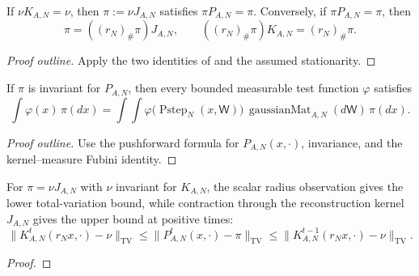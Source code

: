 \begin{lemma}
  \label{lem:gaussian-invariant-transfer}
  \leanok
  If $\nu K_{A,N}=\nu$, then $\pi:=\nu J_{A,N}$ satisfies
  $\pi P_{A,N}=\pi$. Conversely, if $\pi P_{A,N}=\pi$, then
  \[
    \pi=((r_N)_\#\pi)J_{A,N},
    \qquad
    ((r_N)_\#\pi)K_{A,N}=(r_N)_\#\pi.
  \]
\end{lemma}
\begin{proof}[Proof outline]
  \leanok
  Apply the two identities of  and the
  assumed stationarity.
\end{proof}

\begin{lemma}
  \label{lem:gaussian-vector-weak-stationary-equation}
  \leanok
  If $\pi$ is invariant for $P_{A,N}$, then every bounded measurable test function
  $\varphi$ satisfies
  \[
    \int \varphi(x)\,\pi(dx)
    =
    \int\!\!\int \varphi\bigl(\operatorname{Pstep}_N(x,\mathsf W)\bigr)\,
      \operatorname{gaussianMat}_{A,N}(d\mathsf W)\,\pi(dx).
  \]
\end{lemma}
\begin{proof}[Proof outline]
  \leanok
  Use the pushforward formula for $P_{A,N}(x,\cdot)$, invariance, and the
  kernel--measure Fubini identity.
\end{proof}

\begin{lemma}
  \label{lem:gaussian-tv-bracket}
  \leanok
  For $\pi=\nu J_{A,N}$ with $\nu$ invariant for $K_{A,N}$, the scalar radius
  observation gives the lower total-variation bound, while contraction through the
  reconstruction kernel $J_{A,N}$ gives the upper bound at positive times:
  \[
    \|K_{A,N}^t(r_Nx,\cdot)-\nu\|_{\mathrm{TV}}
    \le \|P_{A,N}^t(x,\cdot)-\pi\|_{\mathrm{TV}}
    \le \|K_{A,N}^{t-1}(r_Nx,\cdot)-\nu\|_{\mathrm{TV}}.
  \]
\end{lemma}
\begin{proof}\leanok{}\end{proof}

